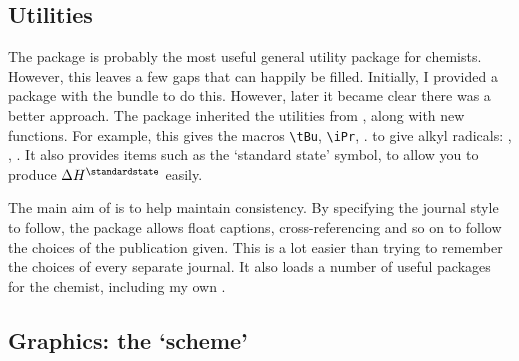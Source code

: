 \begin{bibunit}
\subsection{Utilities}

The  package is probably the most useful general
utility package for chemists.  However, this leaves a few gaps
that can happily be filled.  Initially, I provided a package
with the  bundle to do this.  However, later it became
clear there was a better approach.  The  package
inherited the utilities from , along with new
functions.  For example, this gives the macros \verb|\tBu|,
\verb|\iPr|, \etc. to give alkyl radicals: \tBu, \iPr, \etc. It
also provides items such as the `standard state' symbol, to
allow you to produce $\Delta H^{\standardstate}$ easily.

The main aim of  is to help maintain
consistency.  By specifying the journal style to follow, the
package allows float captions, cross-referencing and so on to
follow the choices of the publication given.  This is a lot
easier than trying to remember the choices of every separate
journal. It also loads a number of useful packages for the
chemist, including my own .

\subsection{Graphics: the `scheme'}


\end{bibunit}
